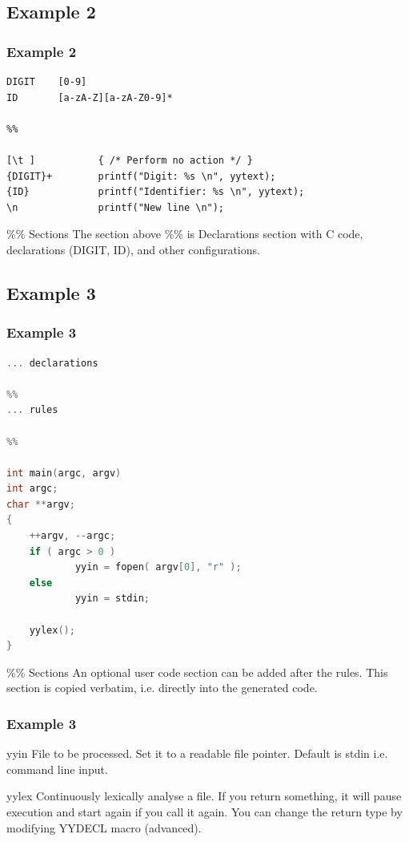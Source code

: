 \documentclass{beamer}
\begin{document}
\subsection{Example 2}

\begin{frame}[fragile]
    \frametitle{Example 2}
    
    \begin{verbatim}
DIGIT    [0-9]
ID       [a-zA-Z][a-zA-Z0-9]*

%%

[\t ]           { /* Perform no action */ }
{DIGIT}+        printf("Digit: %s \n", yytext);
{ID}            printf("Identifier: %s \n", yytext);
\n              printf("New line \n");
    \end{verbatim}
    
    \begin{block}{\%\% Sections}
        The section above \%\% is Declarations section with C code, declarations (DIGIT, ID), and other configurations.
    \end{block}
\end{frame}

\subsection{Example 3}

\begin{frame}[fragile]
    \frametitle{Example 3}
    
    \begin{lstlisting}[basicstyle=\tiny, language=c]
... declarations

%%
... rules

%%

int main(argc, argv)
int argc;
char **argv;
{
    ++argv, --argc;
    if ( argc > 0 )
            yyin = fopen( argv[0], "r" );
    else
            yyin = stdin;

    yylex();
}
    \end{lstlisting}
    
    \begin{block}{\%\% Sections}
        An optional user code section can be added after the rules.
        This section is copied verbatim, i.e. directly into the generated code.
    \end{block}
\end{frame}

\begin{frame}
    \frametitle{Example 3}
    
    \begin{alertblock}{yyin}
        File to be processed. Set it to a readable file pointer.
        Default is stdin i.e. command line input.
    \end{alertblock}
    
    \begin{alertblock}{yylex}
        Continuously lexically analyse a file. If you return something,
        it will pause execution and start again if you call it again.
        You can change the return type by modifying YYDECL macro (advanced).
    \end{alertblock}
\end{frame}
\end{document}
